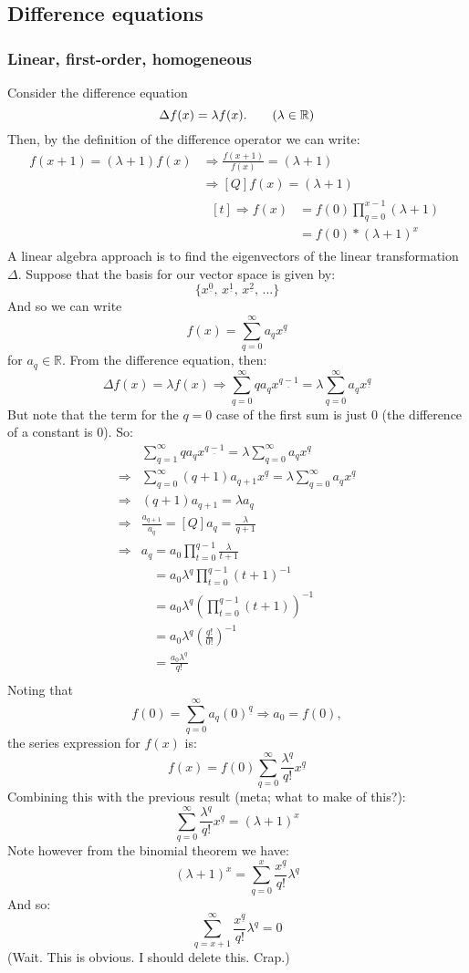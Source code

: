 \documentclass{article}
\renewcommand\({\left(}
\renewcommand\){\right)}
\begin{document}
\subsection{Difference equations}
\subsubsection{Linear, first-order, homogeneous}
Consider the difference equation
\[\Delta f(x)=\lambda f(x).\tag*{($\lambda\in\mathbb{R}$)}\]
Then, by the definition of the difference operator we can write:
\begin{align*}
    f(x+1)=(\lambda+1)f(x)&\Rightarrow\frac{f(x+1)}{f(x)}=(\lambda+1)\\
    &\Rightarrow [Q]f(x)=(\lambda+1)\\
    &\;\begin{aligned}[t]
    \Rightarrow f(x)&=f(0)\prod_{q=0}^{x-1} (\lambda+1)\\
    &=f(0)*(\lambda+1)^x
    \end{aligned}
\end{align*}
A linear algebra approach is to find the eigenvectors of the linear transformation $\Delta$. Suppose that the basis for our vector space is given by:
\[\{x^{\underline{0}},\,x^{\underline{1}},\,x^{\underline{2}},\,...\}\]
And so we can write
\[f(x)=\sum_{q=0}^\infty a_q x^{\underline{q}}\]
for $a_q\in\mathbb{R}$. From the difference equation, then:
\[\Delta f(x)=\lambda f(x)\Rightarrow \sum_{q=0}^\infty qa_q x^{\underline{q-1}}=\lambda\sum_{q=0}^\infty a_q x^{\underline{q}}\]
But note that the term for the $q=0$ case of the first sum is just 0 (the difference of a constant is 0). So:
\begin{align*}
    &\sum_{q=1}^\infty qa_q x^{\underline{q-1}}=\lambda\sum_{q=0}^\infty a_q x^{\underline{q}}\\
    \Rightarrow&\sum_{q=0}^\infty (q+1)a_{q+1} x^{\underline{q}}=\lambda\sum_{q=0}^\infty a_q x^{\underline{q}}\\
    \Rightarrow&(q+1)a_{q+1}=\lambda a_q\\
    \Rightarrow&\frac{a_{q+1}}{a_q}=[Q]a_q=\frac{\lambda}{q+1} \\
    \Rightarrow&a_q=a_0\prod_{t=0}^{q-1}\frac{\lambda}{t+1} \\
    &\phantom{a_q}=a_0\lambda^q\prod_{t=0}^{q-1}(t+1)^{-1} \\
    &\phantom{a_q}=a_0\lambda^q\left(\prod_{t=0}^{q-1}(t+1)\right)^{-1} \\
    &\phantom{a_q}=a_0\lambda^q\left(\frac{q!}{0!}\right)^{-1} \\
    &\phantom{a_q}=\frac{a_0\lambda^q}{q!} \\
\end{align*}
Noting that
\[f(0)=\sum_{q=0}^\infty a_q (0)^{\underline{q}}\Rightarrow a_0=f(0),\]
the series expression for $f(x)$ is:
\[f(x)=f(0)\sum_{q=0}^\infty\frac{\lambda^q}{q!} x^{\underline{q}}\]
Combining this with the previous result (meta; what to make of this?):
\[\sum_{q=0}^\infty\frac{\lambda^q}{q!} x^{\underline{q}}=(\lambda+1)^x\]
Note however from the binomial theorem we have:
\[(\lambda+1)^x=\sum_{q=0}^x\frac{x^{\underline{q}}}{q!} \lambda^q\]
And so:
\[\sum_{q=x+1}^\infty\frac{x^{\underline{q}}}{q!} \lambda^q=0\]
(Wait. This is obvious. I should delete this. Crap.)
\end{document}
